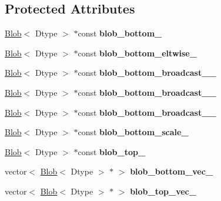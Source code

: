 \subsection*{Protected Attributes}
\begin{DoxyCompactItemize}
\item 
\mbox{\label{classcaffe_1_1_scale_layer_test_a12038d1de3adc6785afa571d4b9417cf}} 
\mbox{\hyperlink{classcaffe_1_1_blob}{Blob}}$<$ Dtype $>$ $\ast$const {\bfseries blob\+\_\+bottom\+\_\+}
\item 
\mbox{\label{classcaffe_1_1_scale_layer_test_ab468dd3ac712042a5b68636e3ba63727}} 
\mbox{\hyperlink{classcaffe_1_1_blob}{Blob}}$<$ Dtype $>$ $\ast$const {\bfseries blob\+\_\+bottom\+\_\+eltwise\+\_\+}
\item 
\mbox{\label{classcaffe_1_1_scale_layer_test_a17bb0866f3406d6bbdd90c6c840f1190}} 
\mbox{\hyperlink{classcaffe_1_1_blob}{Blob}}$<$ Dtype $>$ $\ast$const {\bfseries blob\+\_\+bottom\+\_\+broadcast\+\_\+\_\+}
\item 
\mbox{\label{classcaffe_1_1_scale_layer_test_ab6acf6513484c204dbdc581dd676d44a}} 
\mbox{\hyperlink{classcaffe_1_1_blob}{Blob}}$<$ Dtype $>$ $\ast$const {\bfseries blob\+\_\+bottom\+\_\+broadcast\+\_\+\_\+}
\item 
\mbox{\label{classcaffe_1_1_scale_layer_test_aae918baa6aebd3fd6efafc8bb99e544d}} 
\mbox{\hyperlink{classcaffe_1_1_blob}{Blob}}$<$ Dtype $>$ $\ast$const {\bfseries blob\+\_\+bottom\+\_\+broadcast\+\_\+\_\+}
\item 
\mbox{\label{classcaffe_1_1_scale_layer_test_ad089d9bf675c1d4f86520c6ea0309d8d}} 
\mbox{\hyperlink{classcaffe_1_1_blob}{Blob}}$<$ Dtype $>$ $\ast$const {\bfseries blob\+\_\+bottom\+\_\+scale\+\_\+}
\item 
\mbox{\label{classcaffe_1_1_scale_layer_test_afa46e0dcdbf19c1810a2b60b39426823}} 
\mbox{\hyperlink{classcaffe_1_1_blob}{Blob}}$<$ Dtype $>$ $\ast$const {\bfseries blob\+\_\+top\+\_\+}
\item 
\mbox{\label{classcaffe_1_1_scale_layer_test_a1343170a246c84956e2e4f145903490d}} 
vector$<$ \mbox{\hyperlink{classcaffe_1_1_blob}{Blob}}$<$ Dtype $>$ $\ast$ $>$ {\bfseries blob\+\_\+bottom\+\_\+vec\+\_\+}
\item 
\mbox{\label{classcaffe_1_1_scale_layer_test_abddde080cb2badf3d992f5bcff47dafc}} 
vector$<$ \mbox{\hyperlink{classcaffe_1_1_blob}{Blob}}$<$ Dtype $>$ $\ast$ $>$ {\bfseries blob\+\_\+top\+\_\+vec\+\_\+}
\end{DoxyCompactItemize}
